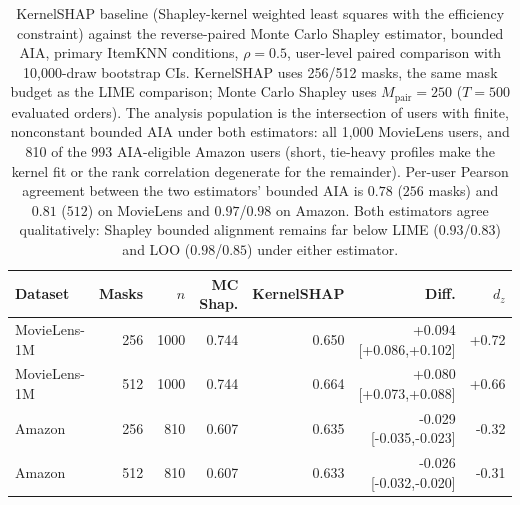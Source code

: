 \begin{table}[t]\centering\scriptsize\setlength{\tabcolsep}{3pt}
\caption{KernelSHAP baseline (Shapley-kernel weighted least squares with the
efficiency constraint) against the reverse-paired Monte Carlo Shapley
estimator, bounded AIA, primary ItemKNN conditions, $\rho=0.5$, user-level
paired comparison with 10,000-draw bootstrap CIs. KernelSHAP uses 256/512
masks, the same mask budget as the LIME comparison; Monte Carlo Shapley uses
$M_{\mathrm{pair}}=250$ ($T=500$ evaluated orders). The analysis population
is the intersection of users with finite, nonconstant bounded AIA under both
estimators: all 1,000 MovieLens users, and 810 of the 993 AIA-eligible
Amazon users (short, tie-heavy profiles make the kernel fit or the rank
correlation degenerate for the remainder). Per-user Pearson agreement
between the two estimators' bounded AIA is $0.78$ ($256$ masks) and $0.81$
($512$) on MovieLens and $0.97$/$0.98$ on Amazon. Both estimators agree
qualitatively: Shapley bounded alignment remains far below LIME ($0.93$/$0.83$)
and LOO ($0.98$/$0.85$) under either estimator.}
\label{tab:review7-kernelschap}
\begin{tabular}{@{}lrrrrrr@{}}
\toprule
Dataset & Masks & $n$ & MC Shap. & KernelSHAP & Diff. & $d_z$ \\
\midrule
MovieLens-1M & 256 & 1000 & 0.744 & 0.650 & +0.094 [+0.086,+0.102] & +0.72 \\
MovieLens-1M & 512 & 1000 & 0.744 & 0.664 & +0.080 [+0.073,+0.088] & +0.66 \\
Amazon & 256 & 810 & 0.607 & 0.635 & -0.029 [-0.035,-0.023] & -0.32 \\
Amazon & 512 & 810 & 0.607 & 0.633 & -0.026 [-0.032,-0.020] & -0.31 \\
\bottomrule
\end{tabular}
\end{table}
